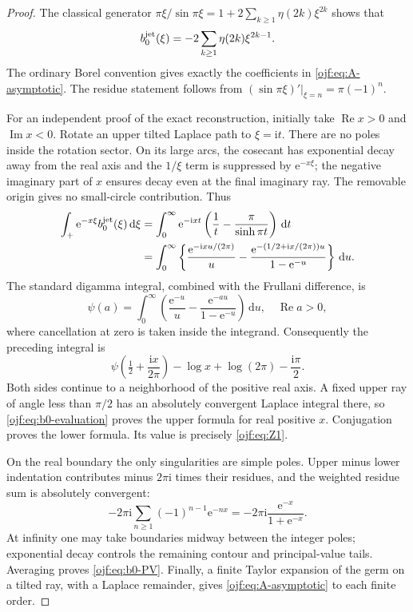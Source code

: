 \documentclass[11pt,a4paper]{article}
\numberwithin{equation}{section}
\theoremstyle{definition}\newtheorem{definition}[theorem]{Definition}
\theoremstyle{remark}\newtheorem{remark}[theorem]{Remark}
\newcommand{\ee}{\mathrm e}\newcommand{\ii}{\mathrm i}\newcommand{\dd}{\,\mathrm d}
\newcommand{\Rea}{\operatorname{Re}}\newcommand{\Ima}{\operatorname{Im}}
\begin{document}
\begin{proof}
The classical generator
$\pi\xi/\sin\pi\xi=1+2\sum_{k\ge1}\eta(2k)\xi^{2k}$
shows that
\[
 b_0^{\rm jet}(\xi)=-2\sum_{k\ge1}\eta(2k)\xi^{2k-1}.
\]
The ordinary Borel convention gives exactly the coefficients in
\eqref{ojf:eq:A-asymptotic}. The residue statement follows from
$(\sin\pi\xi)'|_{\xi=n}=\pi(-1)^n$.

For an independent proof of the exact reconstruction, initially take
$\Rea x>0$ and $\Ima x<0$. Rotate an upper tilted Laplace path to
$\xi=\ii t$. There are no poles inside the rotation sector. On its
large arcs, the cosecant has exponential decay away from the real
axis and the $1/\xi$ term is suppressed by $\ee^{-x\xi}$; the negative
imaginary part of $x$ ensures decay even at the final imaginary ray.
The removable origin gives no small-circle contribution. Thus
\begin{align*}
 \int_+\ee^{-x\xi}b_0^{\rm jet}(\xi)\dd\xi
 &=\int_0^\infty \ee^{-\ii xt}
                   \left(\frac1t-\frac\pi{\sinh\pi t}\right)\dd t\\
 &=\int_0^\infty
       \left\{\frac{\ee^{-\ii xu/(2\pi)}}u
          -\frac{\ee^{-(1/2+\ii x/(2\pi))u}}{1-\ee^{-u}}\right\}\dd u.
\end{align*}
The standard digamma integral, combined with the Frullani difference,
is \cite[\S5.9]{DLMFpsi}
\[
 \psi(a)=\int_0^\infty
          \left(\frac{\ee^{-u}}u-\frac{\ee^{-au}}{1-\ee^{-u}}\right)\dd u,
 \quad \Rea a>0,
\]
where cancellation at zero is taken inside the integrand. Consequently
the preceding integral is
\begin{equation}\label{ojf:eq:b0-evaluation}
 \psi\left(\tfrac12+\frac{\ii x}{2\pi}\right)
                 -\log x+\log(2\pi)-\frac{\ii\pi}{2}.
\end{equation}
Both sides continue to a neighborhood of the positive real axis. A fixed
upper ray of angle less than $\pi/2$ has an absolutely convergent
Laplace integral there, so \eqref{ojf:eq:b0-evaluation} proves the upper
formula for real positive $x$. Conjugation proves the lower formula.
Its value is precisely \eqref{ojf:eq:Z1}.

On the real boundary the only singularities are simple poles. Upper
minus lower indentation contributes minus $2\pi\ii$ times their
residues, and the weighted residue sum is absolutely convergent:
\[
 -2\pi\ii\sum_{n\ge1}(-1)^{n-1}\ee^{-nx}
          =-2\pi\ii\frac{\ee^{-x}}{1+\ee^{-x}}.
\]
At infinity one may take boundaries midway between the integer poles;
exponential decay controls the remaining contour and principal-value
tails. Averaging proves \eqref{ojf:eq:b0-PV}.
Finally, a finite Taylor expansion of the germ on a tilted ray, with a
Laplace remainder, gives \eqref{ojf:eq:A-asymptotic} to each finite order.
\end{proof}
\end{document}
